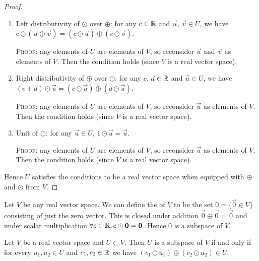 \begin{proof}
\begin{enumerate}[label=(\arabic*)]
  \textsc{Proof:} This is assumption~\ref{assume:closed-under-scalar-multiplication}.
\item Left distributivity of $\odot$ over $\oplus$:
  for any $c\in\mathbb{R}$ and $\vec{u}$, $\vec{v}\in U$, we have
  $c\odot(\vec{u}\oplus\vec{v}) = (c\odot\vec{u})\oplus(c\odot\vec{v})$.

  \textsc{Proof:} any elements of $U$ are elements of $V$, so reconsider
  $\vec{u}$ and $\vec{v}$ as elements of $V$. Then the condition holds
  (since $V$ is a real vector space).
\item Right distributivity of $\oplus$ over $\odot$:
  for any $c$, $d\in\mathbb{R}$ and $\vec{u}\in U$, we have
  $(c+d)\odot\vec{u} = (c\odot\vec{u})\oplus(d\odot\vec{u})$.
  
  \textsc{Proof:} any elements of $U$ are elements of $V$, so reconsider
  $\vec{u}$ as elements of $V$. Then the condition holds
  (since $V$ is a real vector space).
\item Unit of $\odot$: for any $\vec{u}\in U$, $1\odot\vec{u}=\vec{u}$.
  
  \textsc{Proof:} any elements of $U$ are elements of $V$, so reconsider
  $\vec{u}$ as elements of $V$. Then the condition holds
  (since $V$ is a real vector space).
\end{enumerate}
Hence $U$ satisfies the conditions to be a real vector space when
equipped with $\oplus$ and $\odot$ from $V$.
\end{proof}

\begin{example}
Let $V$ be any real vector space. We can define the 
of $V$ to be the set $0=\{\vec{0}\in V\}$ consisting of just the zero
vector. This is closed under addition $\vec{0}\oplus\vec{0}=\vec{0}$ and
under scalar multiplication $\forall c\in\mathbb{R},c\odot\boldsymbol{0}=\boldsymbol{0}$.
Hence $0$ is a subspace of $V$.
\end{example}

\begin{corollary}\label{cor:subspaces:subspace-iff-closed-under-linear-combos}
Let $V$ be a real vector space and $U\subset V$.
Then $U$ is a subspace of $V$ if and only if for every $u_{1},u_{2}\in U$
and $c_{1},c_{2}\in\mathbb{R}$ we have $(c_{1}\odot u_{1})\oplus(c_{2}\odot u_{2})\in U$.
\end{corollary}

